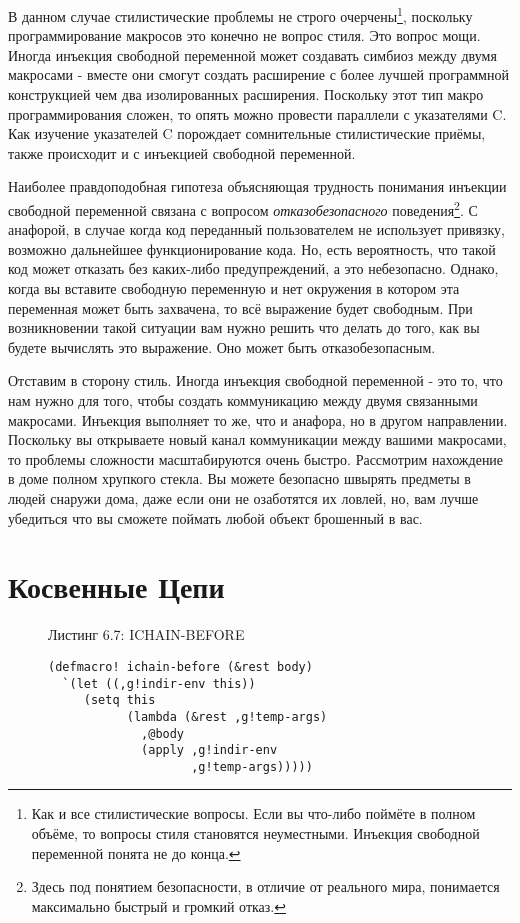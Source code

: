 В данном случае стилистические проблемы не строго очерчены\footnote{Как и все стилистические вопросы. Если вы что-либо поймёте в полном объёме, то вопросы стиля становятся неуместными. Инъекция свободной переменной понята не до конца.}, поскольку программирование макросов это конечно не вопрос стиля. Это вопрос мощи. Иногда инъекция свободной переменной может создавать симбиоз между двумя макросами - вместе они смогут создать расширение с более лучшей программной конструкцией чем два изолированных расширения. Поскольку этот тип макро программирования сложен, то опять можно провести параллели с указателями C. Как изучение указателей C порождает сомнительные стилистические приёмы, также происходит и с инъекцией свободной переменной.



Наиболее правдоподобная гипотеза объясняющая трудность понимания инъекции свободной переменной связана с вопросом \emph{отказобезопасного} поведения\footnote{Здесь под понятием безопасности, в отличие от реального мира, понимается максимально быстрый и громкий отказ.}. С анафорой, в случае когда код переданный пользователем не использует привязку, возможно дальнейшее функционирование кода. Но, есть вероятность, что такой код может отказать без каких-либо предупреждений, а это небезопасно. Однако, когда вы вставите свободную переменную и нет окружения в котором эта переменная может быть захвачена, то всё выражение будет свободным. При возникновении такой ситуации вам нужно решить что делать до того, как вы будете вычислять это выражение. Оно может быть отказобезопасным.

Отставим в сторону стиль. Иногда инъекция свободной переменной - это то, что нам нужно для того, чтобы создать коммуникацию между двумя связанными макросами. Инъекция выполняет то же, что и анафора, но в другом направлении. Поскольку вы открываете новый канал коммуникации между вашими макросами, то проблемы сложности масштабируются очень быстро. Рассмотрим нахождение в доме полном хрупкого стекла. Вы можете безопасно швырять предметы в людей снаружи дома, даже если они не озаботятся их ловлей, но, вам лучше убедиться что вы сможете поймать любой объект брошенный в вас.

\section{Косвенные Цепи}\label{section_indirection_chains}



\begin{figure}Листинг 6.7: ICHAIN-BEFORE\label{listing_6.7}
\listbegin
\begin{verbatim}
(defmacro! ichain-before (&rest body)
  `(let ((,g!indir-env this))
     (setq this
           (lambda (&rest ,g!temp-args)
             ,@body
             (apply ,g!indir-env
                    ,g!temp-args)))))
\end{verbatim}
\listend
\end{figure}

